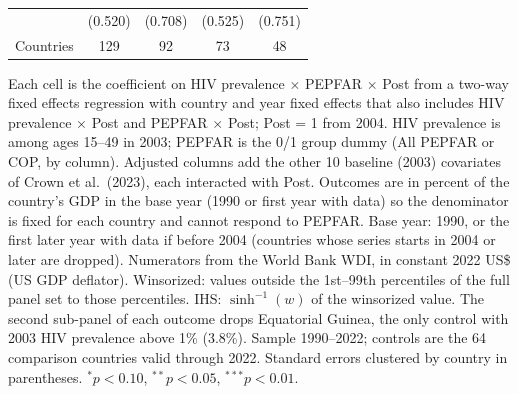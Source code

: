 \begin{table}[htbp]
\begin{tabular}{lcccc}
 & (0.520) & (0.708) & (0.525) & (0.751) \\
Countries & 129 & 92 & 73 & 48 \\
\bottomrule
\end{tabular}
\par\vspace{4pt}
\begin{minipage}{\textwidth}\footnotesize Each cell is the coefficient on HIV prevalence $\times$ PEPFAR $\times$ Post from a two-way fixed effects regression with country and year fixed effects that also includes HIV prevalence $\times$ Post and PEPFAR $\times$ Post; Post = 1 from 2004. HIV prevalence is among ages 15--49 in 2003; PEPFAR is the 0/1 group dummy (All PEPFAR or COP, by column). Adjusted columns add the other 10 baseline (2003) covariates of Crown et al.\ (2023), each interacted with Post. Outcomes are in percent of the country's GDP in the base year (1990 or first year with data) so the denominator is fixed for each country and cannot respond to PEPFAR. Base year: 1990, or the first later year with data if before 2004 (countries whose series starts in 2004 or later are dropped). Numerators from the World Bank WDI, in constant 2022 US\$ (US GDP deflator). Winsorized: values outside the 1st--99th percentiles of the full panel set to those percentiles. IHS: $\sinh^{-1}(w)$ of the winsorized value. The second sub-panel of each outcome drops Equatorial Guinea, the only control with 2003 HIV prevalence above 1\% (3.8\%). Sample 1990--2022; controls are the 64 comparison countries valid through 2022. Standard errors clustered by country in parentheses. $^{*}p<0.10$, $^{**}p<0.05$, $^{***}p<0.01$.\end{minipage}
\end{table}
